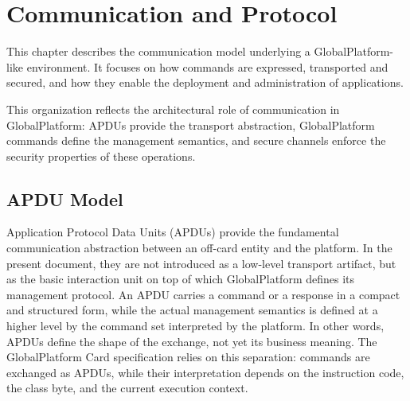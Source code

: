 \chapter{Communication and Protocol}
\label{ch:communication-protocol}

This chapter describes the communication model underlying a GlobalPlatform-like
environment.  It focuses on how commands are expressed, transported and
secured, and how they enable the deployment and administration of applications.

This organization reflects the architectural role of communication in
GlobalPlatform: APDUs provide the transport abstraction, GlobalPlatform
commands define the management semantics, and secure channels enforce the
security properties of these operations.

\section{APDU Model}

Application Protocol Data Units (APDUs) provide the fundamental communication
abstraction between an off-card entity and the platform. In the present
document, they are not introduced as a low-level transport artifact, but as the
basic interaction unit on top of which GlobalPlatform defines its management
protocol. An APDU carries a command or a response in a compact and structured
form, while the actual management semantics is defined at a higher level by the
command set interpreted by the platform. In other words, APDUs define the shape
of the exchange, not yet its business meaning. The GlobalPlatform Card
specification relies on this separation: commands are exchanged as APDUs, while
their interpretation depends on the instruction code, the class byte, and the
current execution context. 

